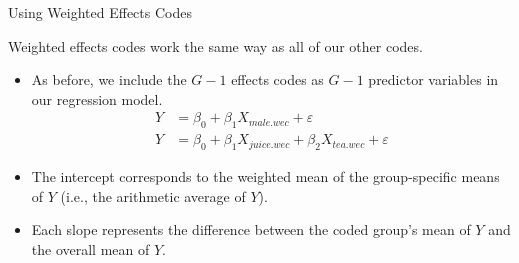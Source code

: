 \documentclass{beamer}\usepackage[]{graphicx}\usepackage[]{color}
\begin{document}
\watermarkon %

\begin{frame}{Using Weighted Effects Codes}
  
  Weighted effects codes work the same way as all of our other codes.
  \vb
  \begin{itemize}
  \item As before, we include the $G - 1$ effects codes as $G - 1$ predictor 
    variables in our regression model.
    \begin{align*}
      Y &= \beta_0 + \beta_1 X_{male.wec} + \varepsilon\\[6pt]
      Y &= \beta_0 + \beta_1 X_{juice.wec} + \beta_2 X_{tea.wec} + \varepsilon
    \end{align*}
  \item The intercept corresponds to the weighted mean of the group-specific 
    means of $Y$ (i.e., the arithmetic average of $Y$).  
    \vb
  \item Each slope represents the difference between the coded group's mean of 
    $Y$ and the overall mean of $Y$.
  \end{itemize}
  
\end{frame}

\watermarkoff %
\end{document}
